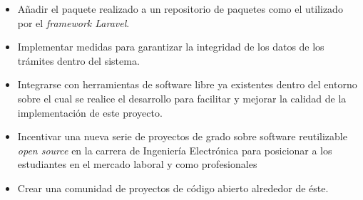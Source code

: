 \begin{itemize}
	\item Añadir el paquete realizado a un repositorio de paquetes como el
	      utilizado por el \textit{framework Laravel}.

	\item Implementar medidas para garantizar la integridad de los datos de los
	      trámites dentro del sistema.

	\item Integrarse con herramientas de software libre ya existentes dentro del
	      entorno sobre el cual se realice el desarrollo para facilitar y mejorar
	      la calidad de la implementación de este proyecto.

	\item Incentivar una nueva serie de proyectos de grado sobre software
	      reutilizable \textit{open source} en la carrera de Ingeniería Electrónica para
	      posicionar a los estudiantes en el mercado laboral y como profesionales

	\item Crear una comunidad de proyectos de código abierto alrededor de éste.
\end{itemize}
